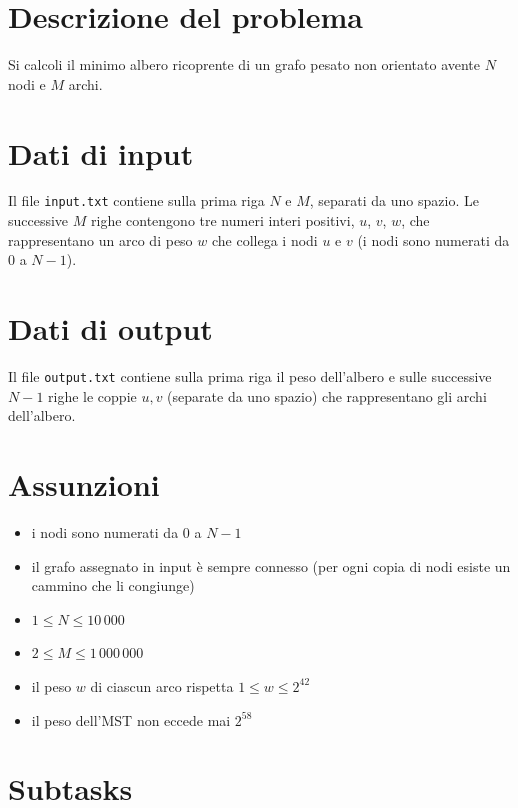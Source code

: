 \documentclass[a4paper,11pt]{article}
\begin{document}


\section*{Descrizione del problema}
  
    Si calcoli il minimo albero ricoprente di un grafo pesato non
    orientato avente $N$ nodi e $M$ archi.
  

\section*{Dati di input}
  
    Il file \texttt{input.txt} contiene sulla prima riga $N$
    e $M$, separati da uno spazio. Le successive $M$
    righe contengono tre numeri interi
    positivi, $u$, $v$, $w$, che
    rappresentano un arco di peso $w$ che collega i
    nodi $u$ e $v$ (i nodi sono numerati da $0$ a $N-1$).
  

\section*{Dati di output}
  
    Il file \texttt{output.txt} contiene sulla prima riga il peso dell'albero e
    sulle successive $N-1$ righe le coppie $u,v$
    (separate da uno spazio) che rappresentano gli archi dell'albero.
  
  \section*{Assunzioni}
  \begin{itemize}
    \item i nodi sono numerati da $0$ a $N-1$
    \item il grafo assegnato in input è sempre connesso (per ogni copia di nodi esiste un cammino che li congiunge)
    \item $1 ≤ N ≤ 10\,000$
    \item $2 ≤ M ≤ 1\,000\,000$
    \item il peso $w$ di ciascun arco rispetta $1 ≤ w ≤ 2^{42}$ 
    \item il peso dell'MST non eccede mai $2^{58}$
  \end{itemize}

\section*{Subtasks}
\end{document}
